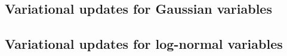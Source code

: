 \documentclass[11pt]{article}
\begin{document}
\subsection{Variational updates for Gaussian variables}

\subsection{Variational updates for log-normal variables}

\end{document}
